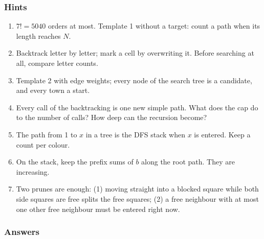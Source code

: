 \subsubsection*{Hints}
\begin{enumerate}[leftmargin=*, label=\textbf{E4.\arabic*}]
    \item $7! = 5040$ orders at most. Template 1 without a target: count a path when its length reaches $N$.
    \item Backtrack letter by letter; mark a cell by overwriting it. Before searching at all, compare letter counts.
    \item Template 2 with edge weights; every node of the search tree is a candidate, and every town a start.
    \item Every call of the backtracking is one new simple path. What does the cap do to the number of calls? How deep can the recursion become?
    \item The path from 1 to $x$ in a tree is the DFS stack when $x$ is entered. Keep a count per colour.
    \item On the stack, keep the prefix sums of $b$ along the root path. They are increasing.
    \item Two prunes are enough: (1) moving straight into a blocked square while both side squares are free splits the free squares; (2) a free neighbour with at most one other free neighbour must be entered right now.
\end{enumerate}

\subsubsection*{Answers}

